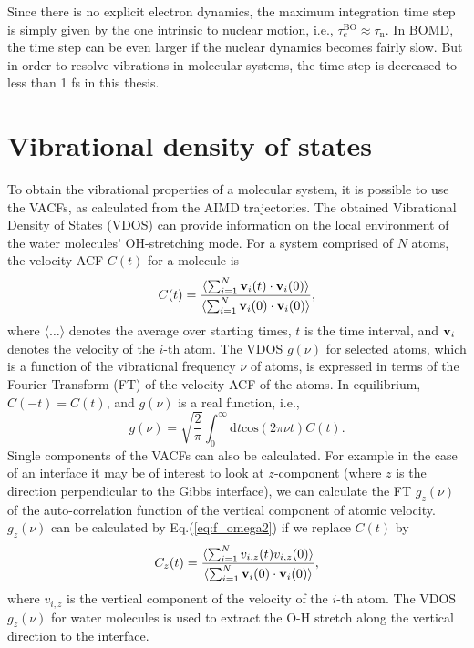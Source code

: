 Since there is no explicit electron dynamics, the maximum integration time step is simply given by the one intrinsic 
to nuclear motion, i.e., $\tau_{e}^{\text{BO}}\approx\tau_{\text{n}}$. 
In BOMD, the time step can be even larger if the nuclear dynamics becomes fairly slow\cite{GK93}. 
But in order to resolve vibrations in molecular systems, the time step is decreased to less than 1 fs in this thesis\cite{DM00}.
%
\section{Vibrational density of states}\label{section_VDOS}
To obtain the vibrational properties of a molecular system, it is possible to use the VACFs,
as calculated from the AIMD trajectories.
The obtained Vibrational Density of States (VDOS) can 
provide information on the local environment of the water molecules' OH-stretching mode. 
For a system comprised of $N$ atoms, the velocity ACF $C(t)$ for a molecule is \cite{MTD,JMD,TI07} 
\begin{equation}
C(t)=\frac{\langle\sum^{N}_{i=1}{\bf{v}}_i(t)\cdot{\bf{v}}_i(0)\rangle}{\langle\sum^{N}_{i=1}{\bf{v}}_i(0)\cdot{\bf{v}}_i(0)\rangle},
\label{eq:Ct3s}
\end{equation}
where $\langle\dots\rangle$ denotes the average over starting times, $t$ is the time interval, and ${\bf{v}}_i$ denotes 
the velocity of the $i$-th atom. The VDOS $g(\nu)$ for selected atoms, which is a function of the vibrational frequency $\nu$ 
of atoms, is expressed in terms of the Fourier Transform (FT) of the velocity ACF of the atoms\cite{MPA86}.
In equilibrium, $C(-t)=C(t)$, and $g(\nu)$ is a real function, i.e., 
\begin{equation}
g(\nu)= \sqrt{\frac{2}{\pi}}\int^{\infty}_{0}\text{d}t \text{cos}(2\pi\nu{t})C(t).
\label{eq:f_omega2}
\end{equation}
Single components of the VACFs can also be calculated. For example in the case of an interface it may be of interest to look at 
$z$-component (where $z$ is the direction perpendicular to the Gibbs interface),
we can calculate the FT $g_z(\nu)$ of the auto-correlation function of the vertical component of atomic velocity. 
$g_z(\nu)$ can be calculated by Eq.\thinspace(\ref{eq:f_omega2}) if we replace $C(t)$ by 
\begin{equation}
C_z(t)=\frac{\langle\sum^{N}_{i=1}{v_{i,z}(t){v_{i,z}(0)\rangle}}}{\langle\sum^{N}_{i=1}{\bf{v}}_i(0)\cdot{\bf{v}}_i(0)\rangle},
\label{eq:ACN}
\end{equation}
where $v_{i,z}$ is the vertical component of the velocity of the $i$-th atom.
The VDOS $g_z(\nu)$ for water molecules is used to extract the O-H stretch along the vertical direction to the interface. 

